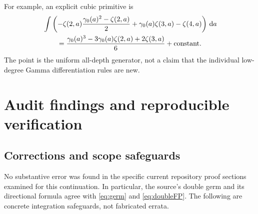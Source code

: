 \documentclass[11pt,a4paper]{article}
\numberwithin{equation}{section}
\theoremstyle{definition}\newtheorem{definition}[theorem]{Definition}
\theoremstyle{remark}\newtheorem{remark}[theorem]{Remark}
\newcommand{\dd}{\,\mathrm d}
\begin{document}
For example, an explicit cubic primitive is
\begin{align}\label{eq:cubicprimitive}
 &\int\left(-\zeta(2,a)\frac{\gamma_0(a)^2-\zeta(2,a)}2
              +\gamma_0(a)\zeta(3,a)-\zeta(4,a)\right)\dd a\notag\\
 &\qquad=\frac{\gamma_0(a)^3-3\gamma_0(a)\zeta(2,a)+2\zeta(3,a)}6
          +\text{constant}.
\end{align}
The point is the uniform all-depth generator, not a claim that the
individual low-degree Gamma differentiation rules are new.

\section{Audit findings and reproducible verification}
\label{sec:audit}

\subsection{Corrections and scope safeguards}
No substantive error was found in the specific current repository
proof sections examined for this continuation. In particular, the
source's double germ and its directional formula agree with
\eqref{eq:germ} and \eqref{eq:doubleFP}. The following are concrete
integration safeguards, not fabricated errata.
\end{document}
